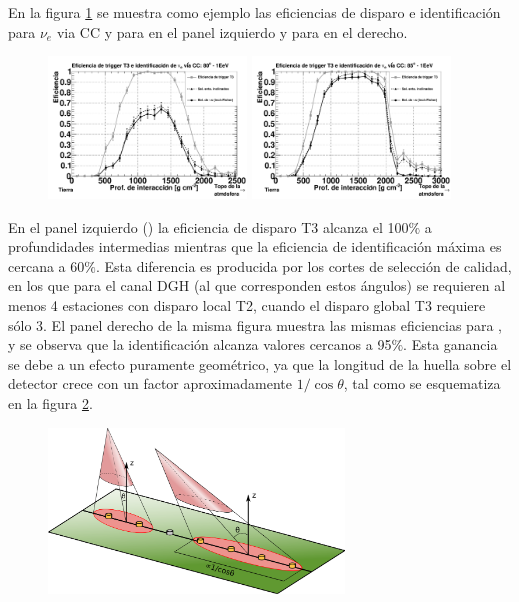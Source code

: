 	En la figura \ref{fig:effDG_th} se muestra como ejemplo las eficiencias de disparo e identificación para $\nu_e$ via CC y  para  en el panel izquierdo y para  en el derecho.
	\begin{figure}[h!]
		\begin{center}
			\includegraphics[width=0.47\textwidth]{fig/resultadosAuger/eff_1EeV_80}
			\hfill
			\includegraphics[width=0.47\textwidth]{fig/resultadosAuger/eff_1EeV_85}
			\caption{}
			\label{fig:effDG_th}
		\end{center}
	\end{figure}
	En el panel izquierdo () la eficiencia de disparo T3 alcanza el 100$\%$ a profundidades intermedias mientras que la eficiencia de identificación máxima es cercana a 60$\%$.
	Esta diferencia es producida por los cortes de selección de calidad, en los que para el canal DGH (al que corresponden estos ángulos) se requieren al menos 4 estaciones con disparo local T2, cuando el disparo global T3 requiere sólo 3.
	El panel derecho de la misma figura muestra las mismas eficiencias para , y se observa que la identificación alcanza valores cercanos a 95$\%$.
	Esta ganancia se debe a un efecto puramente geométrico, ya que la longitud de la huella sobre el detector crece con un factor aproximadamente $1/\cos\theta$, tal como se esquematiza en la figura \ref{fig:effDG_th_sktch}.
	\begin{figure}[h!]
		\begin{center}
			\includegraphics[width=0.7\textwidth]{fig/resultadosAuger/huellas}
			\caption{}
			\label{fig:effDG_th_sktch}
		\end{center}
	\end{figure}
	

